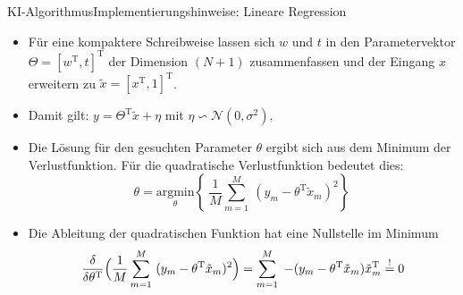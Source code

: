 \documentclass[169, handout	]{THIbeamer} %
\begin{document}
	\begin{frame}{KI-Algorithmus}{Implementierungshinweise: Lineare Regression}
		\footnotesize
		\begin{itemize}			
			\item Für eine kompaktere Schreibweise lassen sich $w$ und $t$ in den Parametervektor $\Theta = [w^{\text{T}}, t]^{\text{T}}$ der Dimension $(N+1)$ zusammenfassen und der Eingang $x$ erweitern zu $ \tilde{x} = [x^{\text{T}}, 1]^{\text{T}}$.
			\item Damit gilt: $
				y = \Theta^{\text{T}} \tilde{x} + \eta \text{ mit } \eta \backsim \mathcal{N}(0, \sigma^2) \text{,} $
			\item Die Lösung für den gesuchten Parameter $\theta$ ergibt sich aus dem Minimum der Verlustfunktion. Für die quadratische Verlustfunktion bedeutet dies:
			\begin{equation}
				\theta = \underset{\theta}{\mathrm{argmin}} \left\{\ \frac{1}{M} \sum_{m=1}^M\ (y_m - \theta^{\text{T}} \tilde{x}_m)^2 \right\}\
			\end{equation}
			\item Die Ableitung der quadratischen Funktion hat eine Nullstelle im Minimum					\begin{equation}
				\frac{\delta}{\delta \theta^{\text{T}}} \Bigl( \frac{1}{M} \sum_{m=1}^M\ (y_m - \theta^{\text{T}} \tilde{x}_m)^2 \Bigr) 
				= \sum_{m=1}^M\ -(y_m - \theta^{\text{T}} \tilde{x}_m) \tilde{x}_m^{\text{T}}
				\stackrel{!}{=} 0 
			\end{equation}

		\end{itemize}
	\end{frame}
\end{document}
